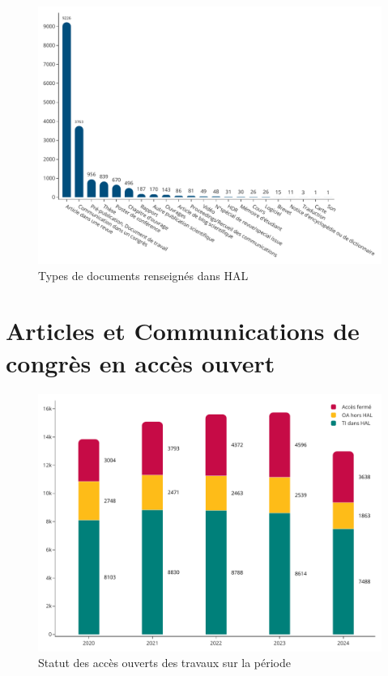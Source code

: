\documentclass[french, 11pt]{dibiso/biso}
\begin{document}
\begin{figure}[!h]
  \includegraphics[width=\textwidth]{figures/works_type.pdf}
  \centering
  \caption{Types de documents renseignés dans HAL}
  \label{fig_doc_type}
\end{figure}

{\footnotesize\workstypeinfo}







\pagebreak

\section{Articles et Communications de congrès en accès ouvert} %

\begin{figure}[!h]
  \includegraphics[width=\textwidth]{figures/open_access_works.pdf}
  \caption{Statut des accès ouverts des travaux sur la période {\oaworksperiod}}
  \label{fig_open_access_works}
\end{figure}
\end{document}
